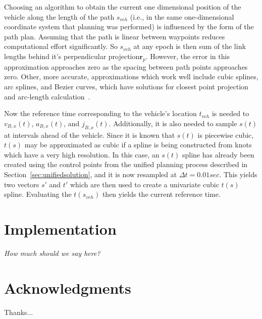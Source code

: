 \documentclass[letterpaper, 10 pt, conference]{ieeeconf}  %
\begin{document}
Choosing an algorithm to obtain the current one dimensional position of the vehicle along the length of the path $s_{veh}$ (i.e., in the same one-dimensional coordinate system that planning was performed) is influenced by the form of the path plan.
Assuming that the path is linear between waypoints reduces computational effort significantly.
So $s_{veh}$ at any epoch is then sum of the link lengths behind it's perpendicular projection$\mathbf{r}_p$.
However, the error in this approximation approaches zero as the spacing between path points approaches zero.
Other, more accurate, approximations which work well include cubic splines, arc splines, and Bezier curves, which have solutions for closest point projection and arc-length calculation~\cite{Wang2002,Wang2003,Schindler2011}.

Now the reference time corresponding to the vehicle's location $t_{veh}$ is needed to $v_{B,x}(t)$, $a_{B,x}(t)$, and $j_{B,x}(t)$.
Additionally, it is also needed to sample $s(t)$ at intervals ahead of the vehicle.
Since it is known that $s(t)$ is piecewise cubic, $t(s)$ may be approximated as cubic if a spline is being constructed from knots which have a very high resolution.
In this case, an $s(t)$ spline has already been created using the control points from the unified planning process described in Section~\ref{sec:unifiedsolution}, and it is now resampled at $\Delta t = 0.01 sec$.
This yields two vectors $s'$ and $t'$ which are then used to create a univariate cubic $t(s)$ spline.
Evaluating the $t(s_{veh})$ then yields the current reference time.


\section{Implementation}

\emph{How much should we say here?}


\section*{Acknowledgments}

Thanks...




\end{document}

